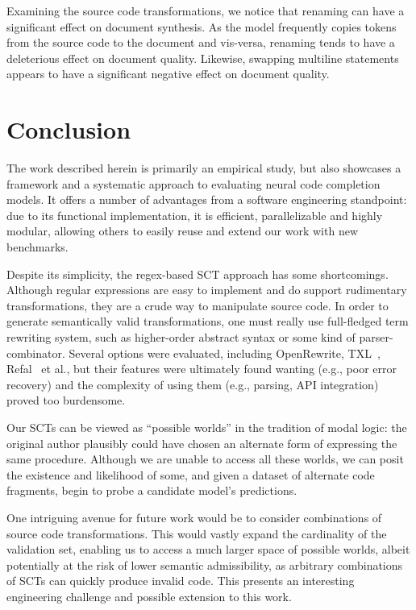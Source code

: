 \documentclass[usenames,dvipsnames]{article} %
\begin{document}
  Examining the source code transformations, we notice that renaming can have a significant effect on document synthesis. As the model frequently copies tokens from the source code to the document and vis-versa, renaming tends to have a deleterious effect on document quality. Likewise, swapping multiline statements appears to have a significant negative effect on document quality.

  \section{Conclusion}\label{sec:conclusion}

  The work described herein is primarily an empirical study, but also showcases a framework and a systematic approach to evaluating neural code completion models. It offers a number of advantages from a software engineering standpoint: due to its functional implementation, it is efficient, parallelizable and highly modular, allowing others to easily reuse and extend our work with new benchmarks.

  Despite its simplicity, the regex-based SCT approach has some shortcomings. Although regular expressions are easy to implement and do support rudimentary transformations, they are a crude way to manipulate source code. In order to generate semantically valid transformations, one must really use full-fledged term rewriting system, such as higher-order abstract syntax or some kind of parser-combinator. Several options were evaluated, including OpenRewrite, TXL~\citep{cordy2004txl}, Refal~\citep{gurin1991refal} et al., but their features were ultimately found wanting (e.g., poor error recovery) and the complexity of using them (e.g., parsing, API integration) proved too burdensome.

  Our SCTs can be viewed as ``possible worlds'' in the tradition of modal logic: the original author plausibly could have chosen an alternate form of expressing the same procedure. Although we are unable to access all these worlds, we can posit the existence and likelihood of some, and given a dataset of alternate code fragments, begin to probe a candidate model's predictions.

  One intriguing avenue for future work would be to consider combinations of source code transformations. This would vastly expand the cardinality of the validation set, enabling us to access a much larger space of possible worlds, albeit potentially at the risk of lower semantic admissibility, as arbitrary combinations of SCTs can quickly produce invalid code. This presents an interesting engineering challenge and possible extension to this work.
\end{document}
